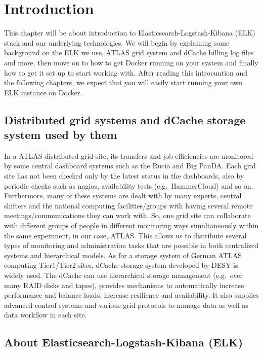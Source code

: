 \documentclass[]{article}
\author{}
\date{}
\begin{document}
\section{Introduction}\label{introduction}

This chapter will be about introduction to Elasticsearch-Logstash-Kibana
(ELK) stack and our underlying technologies. We will begin by explaining
some background on the ELK we use, ATLAS grid system and dCache billing
log files and more, then move on to how to get Docker running on your
system and finally how to get it set up to start working with. After
reading this introcuntion and the following chapters, we expect that you
will easily start running your own ELK instance on Docker.

\subsection{Distributed grid systems and dCache storage system used by
them}\label{distributed-grid-systems-and-dcache-storage-system-used-by-them}

In a ATLAS distributed grid site, its transfers and job efficiencies are
monitored by some central dashboard systems such as the Rucio and Big
PanDA. Each grid site has not been checked only by the latest status in
the dashboards, also by periodic checks such as nagios, availability
tests (e.g.~HammerCloud) and so on. Furthermore, many of these systems
are dealt with by many experts, central shifters and the national
computing facilities/groups with having several remote
meetings/communications they can work with. So, one grid site can
collaborate with different groups of people in different monitoring ways
simultaneously within the same experiment, in our case, ATLAS. This
allows us to distribute several types of monitoring and administration
tasks that are possible in both centralized systems and hierarchical
models. As for a storage system of German ATLAS computing Tier1/Tier2
sites, dCache storage system developed by DESY is widely used. The
dCache can use hierarchical storage management (e.g.~over many RAID
disks and tapes), provides mechanisms to automatically increase
performance and balance loads, increase resilience and availability. It
also supplies advanced control systems and various grid protocols to
manage data as well as data workflow in each site.

\subsection{About Elasticsearch-Logstash-Kibana
(ELK)}\label{about-elasticsearch-logstash-kibana-elk}
\end{document}
